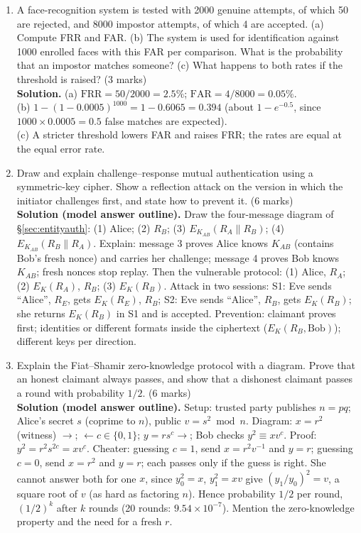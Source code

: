 \begin{enumerate}[leftmargin=1.6em,itemsep=4pt]
  \item A face-recognition system is tested with 2000 genuine attempts, of which 50 are rejected, and 8000 impostor attempts, of which 4 are accepted. (a) Compute FRR and FAR. (b) The system is used for identification against 1000 enrolled faces with this FAR per comparison. What is the probability that an impostor matches someone? (c) What happens to both rates if the threshold is raised? \hfill (3 marks)\\
  \textbf{Solution.} (a) $\mathrm{FRR} = 50/2000 = \mathbf{2.5\%}$; $\mathrm{FAR} = 4/8000 = \mathbf{0.05\%}$.\\
  (b) $1 - (1 - 0.0005)^{1000} = 1 - 0.6065 = \mathbf{0.394}$ (about $1 - e^{-0.5}$, since $1000 \times 0.0005 = 0.5$ false matches are expected).\\
  (c) A stricter threshold lowers FAR and raises FRR; the rates are equal at the equal error rate.

  \item Draw and explain challenge--response mutual authentication using a symmetric-key cipher. Show a reflection attack on the version in which the initiator challenges first, and state how to prevent it. \hfill (6 marks)\\
  \textbf{Solution (model answer outline).} Draw the four-message diagram of \S\ref{sec:entityauth}: (1) Alice; (2) $R_B$; (3) $E_{K_{AB}}(R_A \| R_B)$; (4) $E_{K_{AB}}(R_B \| R_A)$. Explain: message 3 proves Alice knows $K_{AB}$ (contains Bob's fresh nonce) and carries her challenge; message 4 proves Bob knows $K_{AB}$; fresh nonces stop replay. Then the vulnerable protocol: (1) Alice, $R_A$; (2) $E_K(R_A)$, $R_B$; (3) $E_K(R_B)$. Attack in two sessions: S1: Eve sends ``Alice'', $R_E$, gets $E_K(R_E)$, $R_B$; S2: Eve sends ``Alice'', $R_B$, gets $E_K(R_B)$; she returns $E_K(R_B)$ in S1 and is accepted. Prevention: claimant proves first; identities or different formats inside the ciphertext ($E_K(R_B, \text{Bob})$); different keys per direction.

  \item Explain the Fiat--Shamir zero-knowledge protocol with a diagram. Prove that an honest claimant always passes, and show that a dishonest claimant passes a round with probability $1/2$. \hfill (6 marks)\\
  \textbf{Solution (model answer outline).} Setup: trusted party publishes $n = pq$; Alice's secret $s$ (coprime to $n$), public $v = s^2 \bmod n$. Diagram: $x = r^2$ (witness) $\to$; $\leftarrow c \in \{0, 1\}$; $y = r s^c \to$; Bob checks $y^2 \equiv x v^c$. Proof: $y^2 = r^2 s^{2c} = x v^c$. Cheater: guessing $c = 1$, send $x = r^2 v^{-1}$ and $y = r$; guessing $c = 0$, send $x = r^2$ and $y = r$; each passes only if the guess is right. She cannot answer both for one $x$, since $y_0^2 = x$, $y_1^2 = xv$ give $(y_1/y_0)^2 = v$, a square root of $v$ (as hard as factoring $n$). Hence probability $1/2$ per round, $(1/2)^k$ after $k$ rounds (20 rounds: $9.54 \times 10^{-7}$). Mention the zero-knowledge property and the need for a fresh $r$.


\end{enumerate}

